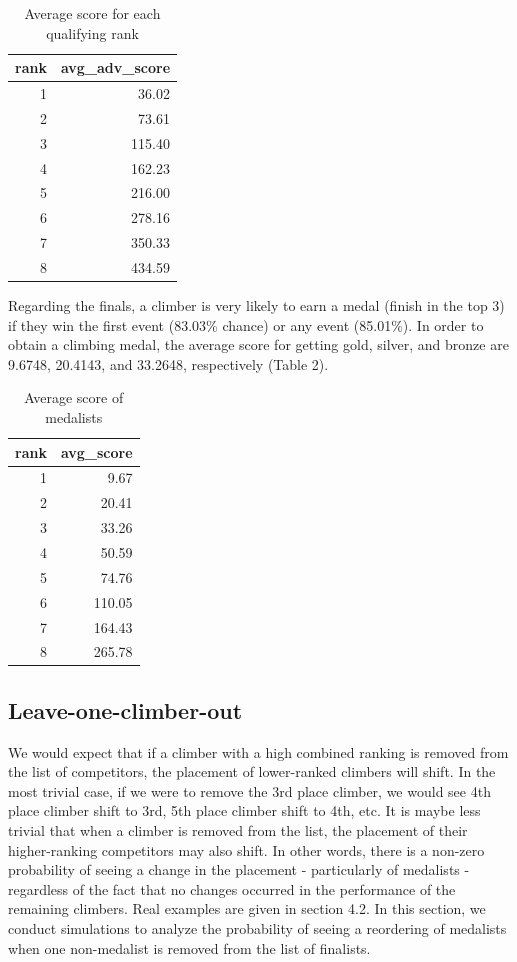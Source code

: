 \documentclass[12pt]{article}
\begin{document}
\begin{table}[ht]
\centering
\caption{Average score for each qualifying rank} 
\begin{tabular}{rr}
  \hline
rank & avg\_adv\_score \\ 
  \hline
  1 & 36.02 \\ 
    2 & 73.61 \\ 
    3 & 115.40 \\ 
    4 & 162.23 \\ 
    5 & 216.00 \\ 
    6 & 278.16 \\ 
    7 & 350.33 \\ 
    8 & 434.59 \\ 
   \hline
\end{tabular}
\end{table}

Regarding the finals, a climber is very likely to earn a medal (finish
in the top 3) if they win the first event (83.03\% chance) or any event
(85.01\%). In order to obtain a climbing medal, the average score for
getting gold, silver, and bronze are 9.6748, 20.4143, and 33.2648,
respectively (Table 2).

\begin{table}[ht]
\centering
\caption{Average score of medalists} 
\begin{tabular}{rr}
  \hline
rank & avg\_score \\ 
  \hline
  1 & 9.67 \\ 
    2 & 20.41 \\ 
    3 & 33.26 \\ 
    4 & 50.59 \\ 
    5 & 74.76 \\ 
    6 & 110.05 \\ 
    7 & 164.43 \\ 
    8 & 265.78 \\ 
   \hline
\end{tabular}
\end{table}

\hypertarget{leave-one-climber-out}{%
\subsection{Leave-one-climber-out}\label{leave-one-climber-out}}

We would expect that if a climber with a high combined ranking is removed from the list of competitors, the placement of lower-ranked climbers will shift. In the most trivial case, if we were to remove the 3rd place climber, we would see 4th place climber shift to 3rd, 5th place climber shift to 4th, etc. It is maybe less trivial that when a climber is removed from the list, the placement of their higher-ranking competitors may also shift. In other words, there is a non-zero probability of seeing a change in the placement - particularly of medalists - regardless of the fact that no changes occurred in the performance of the remaining climbers. Real examples are given in section 4.2. In this section, we conduct simulations to analyze the probability of seeing a reordering of medalists when one non-medalist is removed from the list of finalists.
\end{document}

